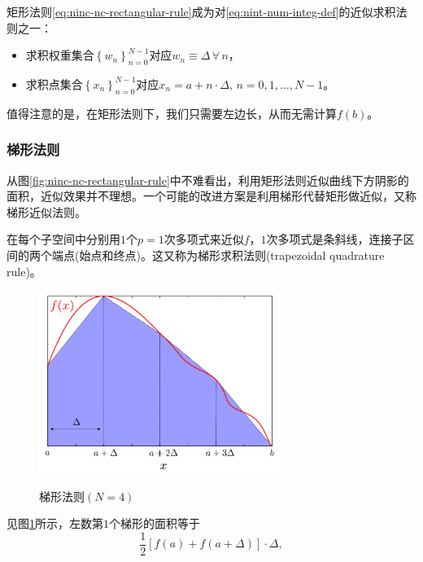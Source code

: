 矩形法则\eqref{eq:ninc-nc-rectangular-rule}成为对\eqref{eq:nint-num-integ-def}的近似求积法则之一：
\begin{itemize}
  \item 求积权重集合$\left\{ w_{n} \right\}_{n=0}^{N-1}$对应$w_{n} \equiv \Delta \, \forall \, n$，
  \item 求积点集合$\left\{ x_{n} \right\}_{n=0}^{N-1}$对应$x_{n} = a + n \cdot \Delta, \, n = 0,1,\ldots,N-1$。
\end{itemize}

值得注意的是，在矩形法则下，我们只需要左边长，从而无需计算$f(b)$。


\subsubsection{梯形法则}
\label{sec:ninc-nc-trapezoidal-rule}
从图\ref{fig:ninc-nc-rectangular-rule}中不难看出，利用矩形法则近似曲线下方阴影的面积，近似效果并不理想。一个可能的改进方案是利用梯形代替矩形做近似，又称梯形近似法则。

在每个子空间中分别用$1$个$p=1$次多项式来近似$f$，$1$次多项式是条斜线，连接子区间的两个端点(始点和终点)。这又称为梯形求积法则(trapezoidal quadrature rule)。

\begin{figure}[htbp]
  \caption{梯形法则$(N=4)$}
  \centering
  \includegraphics[width=8cm]{./Figures/20180227-trapezoidal-rule-example.png}
  \label{fig:ninc-nc-trapezoidal-rule}
%
\end{figure}

见图\ref{fig:ninc-nc-trapezoidal-rule}所示，左数第$1$个梯形的面积等于
\begin{equation*}
  \frac{1}{2} \left[ f \left( a \right) + f \left( a + \Delta \right) \right] \cdot \Delta,
\end{equation*}

